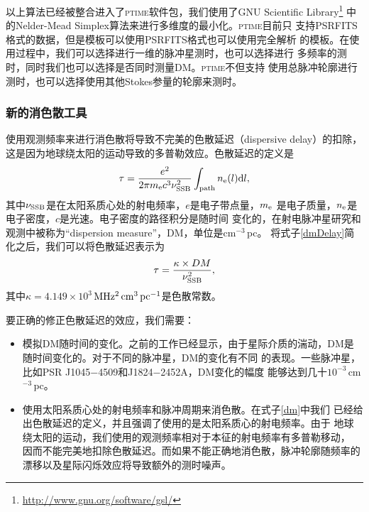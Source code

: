 以上算法已经被整合进入了\textsc{ptime}软件包，我们使用了GNU Scientific Library\footnote{\url{http://www.gnu.org/software/gsl/}} 
中的Nelder-Mead Simplex算法来进行多维度的最小化。\textsc{ptime}目前只
支持PSRFITS格式的数据，但是模板可以使用PSRFITS格式也可以使用完全解析
的模板。在使用过程中，我们可以选择进行一维的脉冲星测时，也可以选择进行
多频率的测时，同时我们也可以选择是否同时测量DM。\textsc{ptime}不但支持
使用总脉冲轮廓进行测时，也可以选择使用其他Stokes参量的轮廓来测时。

\subsubsection{新的消色散工具}

使用观测频率来进行消色散将导致不完美的色散延迟（dispersive delay）的扣除，
这是因为地球绕太阳的运动导致的多普勒效应。色散延迟的定义是
\begin{equation}
\label{dmDelay}
\tau=\frac{e^2}{2\pi m_{\rm{e}}c^3\nu_{\rm{SSB}}^2}\int_{\rm{path}}n_{\rm{e}}(l){\rm{d}}l,
\end{equation}
其中$\nu_{\rm{SSB}}$是在太阳系质心处的射电频率，$e$是电子带点量，$m_{\rm{e}}$
是电子质量，$n_{\rm{e}}$是电子密度，$c$是光速。电子密度的路径积分是随时间
变化的，在射电脉冲星研究和观测中被称为“dispersion measure”，DM，单位是cm$^{-3}$\,pc。
将式子\ref{dmDelay}简化之后，我们可以将色散延迟表示为
\begin{equation}
\tau=\frac{\kappa\times DM}{\nu_{\rm{SSB}}^{2}},
\end{equation}
%
其中$\kappa=4.149\times 10^{3}$\,$\rm{MHz^{2}\,cm^{3}\,pc^{-1}}$是色散常数。

要正确的修正色散延迟的效应，我们需要：
\begin{itemize}
\item 模拟DM随时间的变化。之前的工作已经显示，由于星际介质的湍动，DM是
随时间变化的\supercite{yhc+07,Keith13}。对于不同的脉冲星，DM的变化有不同
的表现。一些脉冲星，比如PSR J1045$-$4509和J1824$-$2452A，DM变化的幅度
能够达到几十$10^{-3}$\,cm$^{-3}$\,pc。
\item 使用太阳系质心处的射电频率和脉冲周期来消色散。在式子\ref{dm}中我们
已经给出色散延迟的定义，并且强调了使用的是太阳系质心的射电频率。由于
地球绕太阳的运动，我们使用的观测频率相对于本征的射电频率有多普勒移动，
因而不能完美地扣除色散延迟。而如果不能正确地消色散，脉冲轮廓随频率的
漂移以及星际闪烁效应将导致额外的测时噪声。
\end{itemize}


